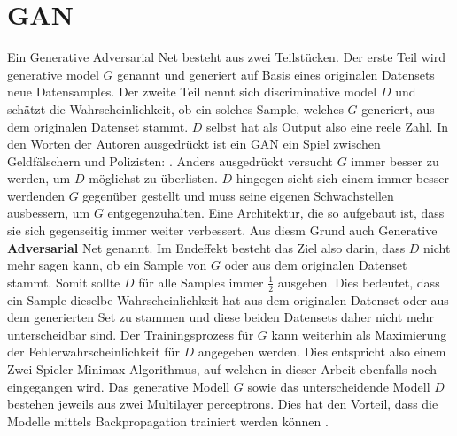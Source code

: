 \chapter{GAN}
Ein \glqq Generative Adversarial Net\grqq{} besteht aus zwei Teilstücken. Der erste Teil wird \glqq generative model $G$\grqq{}
genannt und generiert auf Basis eines originalen Datensets neue Datensamples. Der zweite Teil nennt sich \glqq discriminative model $D$\grqq{}
und schätzt die Wahrscheinlichkeit, ob ein solches Sample, welches $G$ generiert, aus dem originalen Datenset stammt. $D$
selbst hat als Output also eine reele Zahl. \cite{8253599}
In den Worten der Autoren ausgedrückt ist ein \Gls{GAN} ein Spiel zwischen Geldfälschern und Polizisten:
 \cite{8253599}.
Anders ausgedrückt versucht $G$ immer besser zu werden, um $D$ möglichst zu überlisten. $D$ hingegen sieht sich einem immer
besser werdenden $G$ gegenüber gestellt und muss seine eigenen Schwachstellen ausbessern, um $G$ entgegenzuhalten. Eine Architektur, die
so aufgebaut ist, dass sie sich gegenseitig immer weiter verbessert. Aus diesm Grund auch \glqq Generative \textbf{Adversarial} Net\grqq{} genannt.
\para
Im Endeffekt besteht das Ziel also darin, dass $D$ nicht mehr sagen kann, ob ein Sample von $G$ oder aus dem originalen Datenset stammt.
Somit sollte $D$ für alle Samples immer $\frac{1}{2}$ ausgeben. Dies bedeutet, dass ein Sample dieselbe Wahrscheinlichkeit
hat aus dem originalen Datenset oder aus dem generierten Set zu stammen und diese
beiden Datensets daher nicht mehr unterscheidbar sind.
Der Trainingsprozess für $G$ kann weiterhin als Maximierung der Fehlerwahrscheinlichkeit für $D$ angegeben werden. Dies entspricht also einem
Zwei-Spieler Minimax-Algorithmus, auf welchen in dieser Arbeit ebenfalls noch eingegangen wird.\cite{8253599}
\para
Das generative Modell $G$ sowie das unterscheidende Modell $D$ bestehen jeweils aus zwei \Glspl{Multilayer perceptron}. Dies hat
den Vorteil, dass die Modelle mittels \Gls{Backpropagation} trainiert werden können \cite{8253599}.

